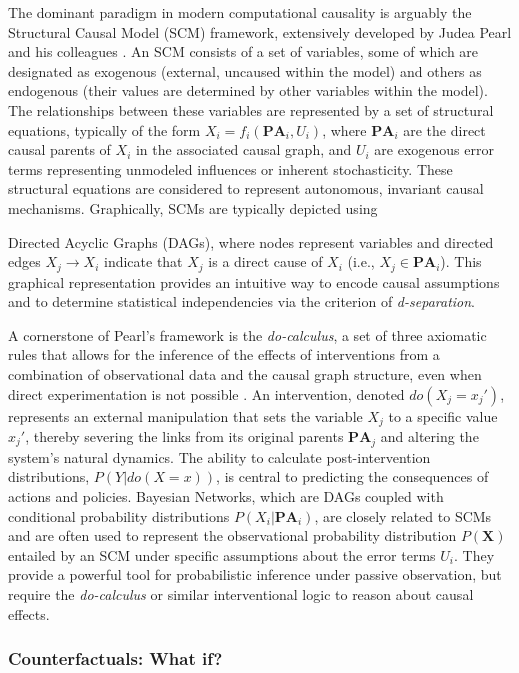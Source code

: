 {The dominant paradigm in modern computational causality is arguably the Structural Causal Model (SCM) framework, extensively developed by Judea Pearl and his colleagues \cite{Pearl2009Causality}. An SCM consists of a set of variables, some of which are designated as exogenous (external, uncaused within the model) and others as endogenous (their values are determined by other variables within the model). The relationships between these variables are represented by a set of structural equations, typically of the form $X_i = f_i(\mathbf{PA}_i, U_i)$, where $\mathbf{PA}_i$ are the direct causal parents of $X_i$ in the associated causal graph, and $U_i$ are exogenous error terms representing unmodeled influences or inherent stochasticity. These structural equations are considered to represent autonomous, invariant causal mechanisms. Graphically, SCMs are typically depicted using {Directed Acyclic Graphs (DAGs), where nodes represent variables and directed edges $X_j \to X_i$ indicate that $X_j$ is a direct cause of $X_i$ (i.e., $X_j \in \mathbf{PA}_i$). This graphical representation provides an intuitive way to encode causal assumptions and to determine statistical independencies via the criterion of \textit{d-separation}.

A cornerstone of Pearl's framework is the \textit{do-calculus}, a set of three axiomatic rules that allows for the inference of the effects of interventions from a combination of observational data and the causal graph structure, even when direct experimentation is not possible \cite{Pearl2009Causality}. An intervention, denoted $do(X_j=x_j')$, represents an external manipulation that sets the variable $X_j$ to a specific value $x_j'$, thereby severing the links from its original parents $\mathbf{PA}_j$ and altering the system's natural dynamics. The ability to calculate post-intervention distributions, $P(Y | do(X=x))$, is central to predicting the consequences of actions and policies. Bayesian Networks, which are DAGs coupled with conditional probability distributions $P(X_i | \mathbf{PA}_i)$, are closely related to SCMs and are often used to represent the observational probability distribution $P(\mathbf{X})$ entailed by an SCM under specific assumptions about the error terms $U_i$. They provide a powerful tool for probabilistic inference under passive observation, but require the \textit{do-calculus} or similar interventional logic to reason about causal effects.

\newpage

\subsubsection{Counterfactuals: What if?}
\label{subsec:counterfactuals}

}}
